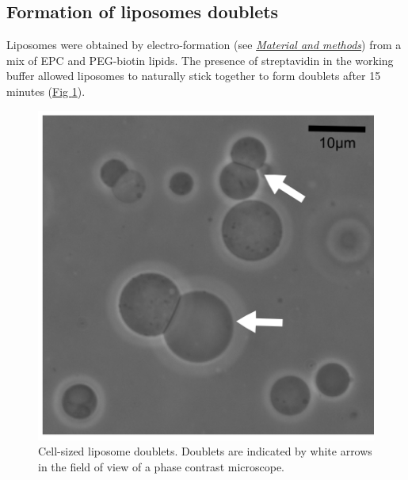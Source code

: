 \documentclass[A4paperpaper,11pt,english]{sphinxmanual}
\begin{document}
\subsection{Formation of liposomes doublets}
\label{index-latex:formation-of-liposomes-doublets}
Liposomes were obtained by electro-formation (see {\hyperref[index-latex:electroformation]{\emph{Material and methods}}}) from a mix of EPC and PEG-biotin lipids. The presence of
streptavidin in the working buffer allowed liposomes to naturally stick together
to form doublets after 15 minutes (\hyperref[index-latex:fig1a]{Fig  \ref*{index-latex:fig1a}}).
\begin{figure}[htbp]
\centering
\capstart

\includegraphics[width=0.500\linewidth]{Fig_01-A.png}
\caption{Cell-sized liposome doublets. Doublets are indicated by white arrows in
the field of view of a phase contrast microscope.}\label{index-latex:fig1a}\end{figure}
\end{document}
